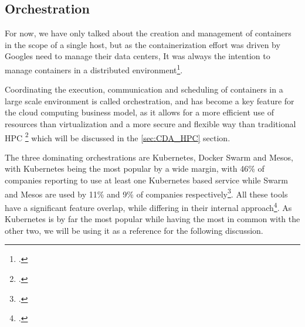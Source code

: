 
\subsection{Orchestration}
\label{sec:orchestration}

For now, we have only talked about the creation and management of containers in the scope of a single \gls{host},
but as the containerization effort was driven by Googles need to manage their data centers,
It was always the intention to manage containers in a distributed environment\footcite{vermaLargescaleClusterManagement2015}.

Coordinating the execution, communication and scheduling of containers in a large scale environment is called orchestration,
and has become a key feature for the cloud computing business model, as it allows for a more efficient use of resources than virtualization
and a more secure and flexible way than traditional \ac{HPC} \footcite{kennyKubernetesHPCAdministration2021} which will be discussed in the \ref{sec:CDA_HPC} section.

The three dominating orchestrations are Kubernetes, Docker Swarm and Mesos,
with Kubernetes being the most popular by a wide margin, with 46\% of companies reporting to use at least one Kubernetes based service
while Swarm and Mesos are used by 11\% and 9\% of companies respectively\footcite{gardenContainerOrchestratorUsage}.
All these tools have a significant feature overlap,
while differing in their internal approach\footcite{truyenComprehensiveFeatureComparison2019}.
As Kubernetes is by far the most popular while having the most in common with the other two,
we will be using it as a reference for the following discussion.


